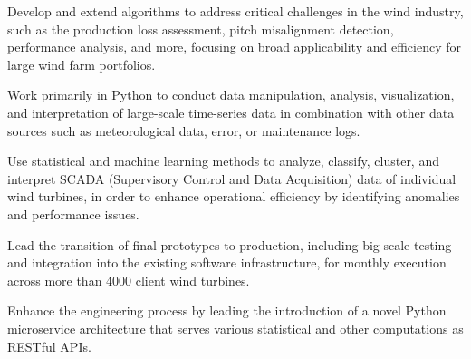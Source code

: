 \begin{tightemize}
    \item Develop and extend algorithms to address critical challenges in the wind industry, such as the production loss assessment, pitch misalignment detection, performance analysis, and more, focusing on broad applicability and efficiency for large wind farm portfolios.
    \item Work primarily in Python to conduct data manipulation, analysis, visualization, and interpretation of large-scale time-series data in combination with other data sources such as meteorological data, error, or maintenance logs.
    \item Use statistical and machine learning methods to analyze, classify, cluster, and interpret SCADA (Supervisory Control and Data Acquisition) data of individual wind turbines, in order to enhance operational efficiency by identifying anomalies and performance issues.
    \item Lead the transition of final prototypes to production, including big-scale testing and integration into the existing software infrastructure, for monthly execution across more than 4000 client wind turbines.
    \item Enhance the engineering process by leading the introduction of a novel Python microservice architecture that serves various statistical and other computations as RESTful APIs.
\end{tightemize}